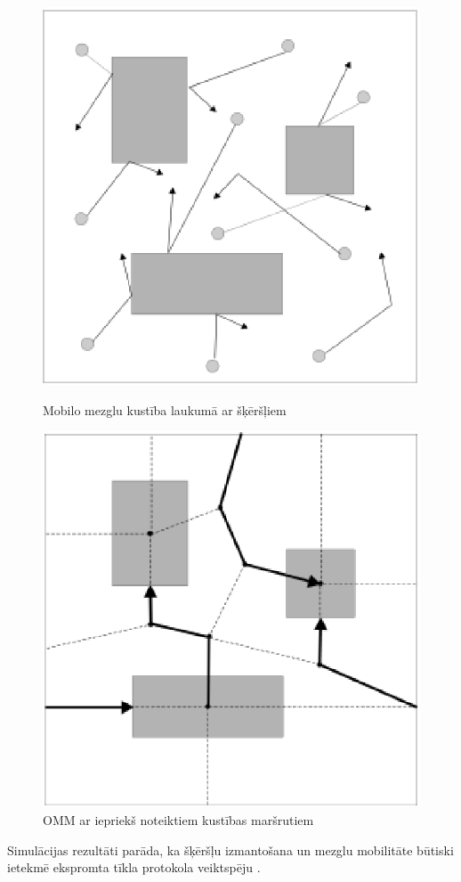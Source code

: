 \begin{figure}[htb!]
\begin{minipage}[t]{0.49\linewidth}
\centering
\includegraphics[scale=0.5]{./graph/OMM1}
\caption{Mobilo mezglu kustība laukumā ar šķēršļiem \cite{jabras}} \label{fig:omm1}
\end{minipage}%
\hspace{0.1cm}
\begin{minipage}[t]{0.49\linewidth}
\centering
\includegraphics[scale=0.5]{./graph/OMM2}
\caption{OMM ar iepriekš noteiktiem kustības maršrutiem \cite{jabras}} \label{fig:omm2}
\end{minipage}
\end{figure}

Simulācijas rezultāti parāda, ka šķēršļu izmantošana un mezglu mobilitāte būtiski ietekmē ekspromta tīkla protokola veiktspēju \cite{jabras}.